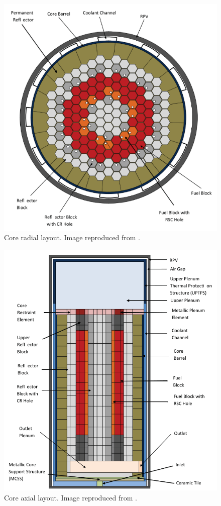 \documentclass{anstrans}
\begin{document}
\begin{figure}[htbp!] %
	\centering
	\includegraphics[width=0.95\linewidth]{figures/radial-layout.png}
	\hfill
	\caption{Core radial layout. Image reproduced from \cite{oecd_nea_benchmark_2017}.}
	\label{fig:radial}
\end{figure}

\begin{figure}[htbp!]
	\centering
	\includegraphics[width=0.95\linewidth]{figures/axial-layout.png}
	\hfill
	\caption{Core axial layout. Image reproduced from \cite{oecd_nea_benchmark_2017}.}
	\label{fig:axial}
\end{figure}
\end{document}
